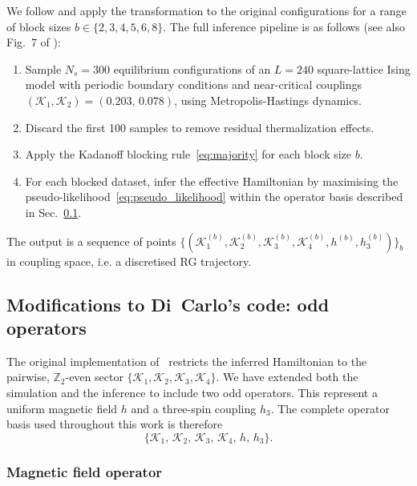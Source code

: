 \documentclass[a4paper, 11pt]{article}
\begin{document}
We follow \cite{blocking} and apply the transformation to the original configurations for a range of block sizes $b\in\{2,3,4,5,6,8\}$. The full inference pipeline is as follows (see also Fig.~7 of
\cite{blocking}):
\begin{enumerate}
  \item Sample $N_s = 300$ equilibrium configurations of an $L=240$ square-lattice Ising model with periodic boundary conditions and near-critical couplings $(\mathcal{K}_1,\mathcal{K}_2)=(0.203,\,0.078)$, using Metropolis-Hastings dynamics.
  \item Discard the first 100 samples to remove residual thermalization effects.
  \item Apply the Kadanoff blocking rule~\eqref{eq:majority} for each block size $b$.
  \item For each blocked dataset, infer the effective Hamiltonian by maximising the pseudo-likelihood~\eqref{eq:pseudo_likelihood} within the operator basis described in Sec.~\ref{app:odd_operators}.
\end{enumerate}
The output is a sequence of points $\bigl\{(\mathcal{K}_1^{(b)},\mathcal{K}_2^{(b)},\mathcal{K}_3^{(b)}, \mathcal{K}_4^{(b)},h^{(b)},h_3^{(b)})\bigr\}_b$ in coupling space, i.e. a discretised RG trajectory.


\subsection{Modifications to Di~Carlo's code: odd operators}
\label{app:odd_operators}

The original implementation of~\cite{blocking} restricts the inferred Hamiltonian to the pairwise, $\mathbb{Z}_2$-even sector $\{\mathcal{K}_1,\mathcal{K}_2,\mathcal{K}_3,\mathcal{K}_4\}$. We have extended both the simulation and the inference to include two odd operators. This represent a uniform magnetic field $h$ and a three-spin coupling $h_3$. The complete operator basis used throughout this work is therefore
\begin{equation}
  \{\mathcal{K}_1,\,\mathcal{K}_2,\,\mathcal{K}_3,\,\mathcal{K}_4,\,
  h,\,h_3\} .
  \label{eq:basis}
\end{equation}



\subsubsection*{Magnetic field operator}
\end{document}
